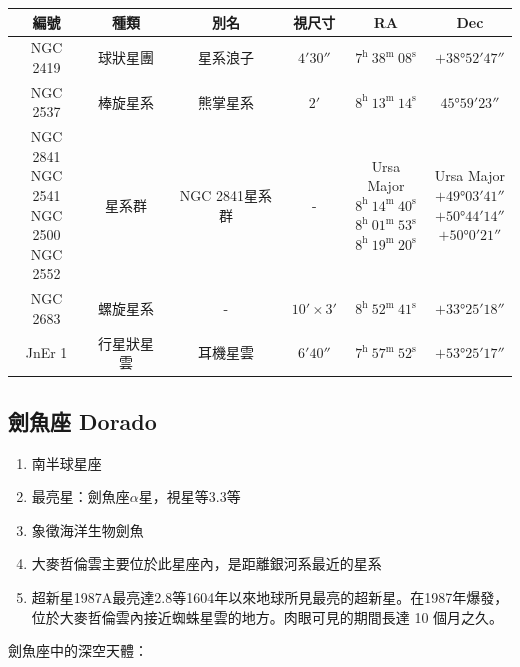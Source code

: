 \begin{center}
\begin{longtable}{c | c | c | c | c | c}
    編號 & 種類 & 別名 & 視尺寸 & RA & Dec \\
    \hline
    \endfirsthead


    \endfoot

    \endlastfoot

    NGC 2419 & 球狀星團 & 星系浪子 & \(\ang{;4;30}\) & \(7^\text{h }38^\text{m }08^\text{s}\) & \(+\ang{38;52;47}\) \\
    NGC 2537 & 棒旋星系 & 熊掌星系 & \(\ang{;2;}\) & \(8^\text{h }13^\text{m }14^\text{s}\) & \(\ang{45;59;23}\) \\
    \makecell{NGC 2841\\NGC 2541\\NGC 2500\\NGC 2552} & 星系群 & NGC 2841星系群 & - & \makecell{Ursa Major\\\(8^\text{h }14^\text{m }40^\text{s}\)\\\(8^\text{h }01^\text{m }53^\text{s}\)\\\(8^\text{h }19^\text{m }20^\text{s}\)} & \makecell{Ursa Major\\\(+\ang{49;03;41}\)\\\(+\ang{50;44;14}\)\\\(+\ang{50;0;21}\)} \\
    NGC 2683 & 螺旋星系 & - & \(\ang{;10;}\times\ang{;3;}\) & \(8^\text{h }52^\text{m }41^\text{s}\) & \(+\ang{33;25;18}\) \\
    JnEr 1 & 行星狀星雲 & 耳機星雲 & \(\ang{;6;40}\) & \(7^\text{h }57^\text{m }52^\text{s}\) & \(+\ang{53;25;17}\) \\
\end{longtable}
\end{center}

\subsection{劍魚座 Dorado}
\begin{enumerate}
    \item 南半球星座
    \item 最亮星：劍魚座\(\alpha\)星，視星等3.3等
    \item 象徵海洋生物劍魚
    \item 大麥哲倫雲主要位於此星座內，是距離銀河系最近的星系
    \item 超新星1987A最亮達2.8等1604年以來地球所見最亮的超新星。在1987年爆發，位於大麥哲倫雲內接近蜘蛛星雲的地方。肉眼可見的期間長達 10 個月之久。
\end{enumerate}
劍魚座中的深空天體：

